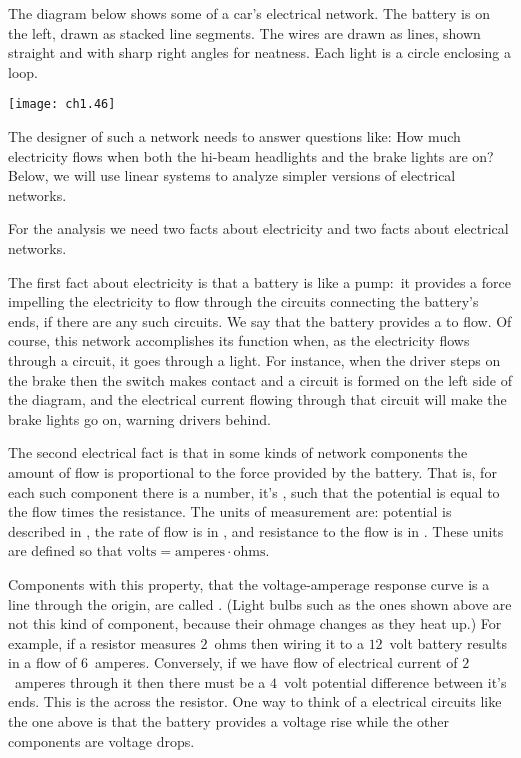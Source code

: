 The diagram below shows some of a car's electrical network.
The battery is on the left, drawn as stacked line segments. 
The wires are drawn as lines, shown straight and with sharp right angles
for neatness.
Each light is a circle enclosing a loop.
\begin{center}
  \texttt{[image: ch1.46]}
\end{center}
The designer of such a network needs to answer questions like: 
How much electricity flows 
when both the hi-beam headlights and the brake lights are on?
Below, we will use linear systems to analyze simpler versions of
electrical networks. 

For the analysis we need two facts about electricity 
and two facts about electrical networks.

The first fact about electricity is that a battery is like a pump:~it 
provides a force impelling the electricity to flow through the 
circuits connecting the battery's ends, if there are any such circuits.  
We say that the battery provides a 
to flow.
Of course, this network accomplishes its function when, as the electricity  
flows through a circuit, it goes through a light.
For instance, when the driver steps on the brake then the switch makes contact
and a circuit is formed on the left side of the
diagram, and the electrical current flowing through that circuit will
make the brake lights go on, warning drivers behind.

The second electrical fact is that in some 
kinds of network components 
the amount of flow is proportional to the force provided by the battery.
That is, for each such component there is a number,  
it's ,
such that the potential is equal to the flow times the resistance.
The units of measurement are: potential is described in ,
the rate of flow is in ,
and resistance to the flow is in .
These units are defined so that
$\mbox{volts}=\mbox{amperes}\cdot\mbox{ohms}$.

Components with this property,
that the voltage-amperage response curve is a line through the origin,
are called .
(Light bulbs such as the ones shown above are not this kind of component,
because their ohmage changes as they heat up.)
For example, if a resistor measures $2$~ohms 
then wiring it to a $12$~volt battery 
results in a flow of $6$~amperes.
Conversely, if we have flow of electrical current of
$2$~amperes through it then there must be 
a $4$~volt potential difference  
between it's ends. 
This is the  across the 
resistor.
One way to think of a electrical circuits like the one above
is that the battery provides a voltage rise while the other components 
are voltage drops.

